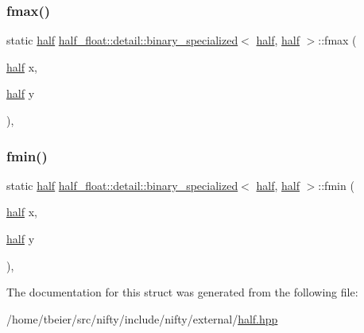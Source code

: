 \subsubsection{\texorpdfstring{fmax()}{fmax()}}
{\footnotesize\ttfamily static \hyperlink{classhalf__float_1_1half}{half} \hyperlink{structhalf__float_1_1detail_1_1binary__specialized}{half\+\_\+float\+::detail\+::binary\+\_\+specialized}$<$ \hyperlink{classhalf__float_1_1half}{half}, \hyperlink{classhalf__float_1_1half}{half} $>$\+::fmax (\begin{DoxyParamCaption}\item[{\hyperlink{classhalf__float_1_1half}{half}}]{x,  }\item[{\hyperlink{classhalf__float_1_1half}{half}}]{y }\end{DoxyParamCaption})\hspace{0.3cm}{\ttfamily [inline]}, {\ttfamily [static]}}

\mbox{\label{structhalf__float_1_1detail_1_1binary__specialized_3_01half_00_01half_01_4_a26cf067eeb5a5a7b20d0da1ddade32ad}} 
\subsubsection{\texorpdfstring{fmin()}{fmin()}}
{\footnotesize\ttfamily static \hyperlink{classhalf__float_1_1half}{half} \hyperlink{structhalf__float_1_1detail_1_1binary__specialized}{half\+\_\+float\+::detail\+::binary\+\_\+specialized}$<$ \hyperlink{classhalf__float_1_1half}{half}, \hyperlink{classhalf__float_1_1half}{half} $>$\+::fmin (\begin{DoxyParamCaption}\item[{\hyperlink{classhalf__float_1_1half}{half}}]{x,  }\item[{\hyperlink{classhalf__float_1_1half}{half}}]{y }\end{DoxyParamCaption})\hspace{0.3cm}{\ttfamily [inline]}, {\ttfamily [static]}}



The documentation for this struct was generated from the following file\+:\begin{DoxyCompactItemize}
\item 
/home/tbeier/src/nifty/include/nifty/external/\hyperlink{half_8hpp}{half.\+hpp}\end{DoxyCompactItemize}
